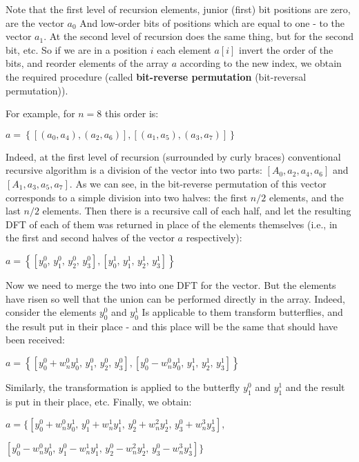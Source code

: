 Note that the first level of recursion elements, junior (first) bit positions are zero, are the vector $a_0$ And low-order bits of positions which are equal to one - to the vector $a_1$. At the second level of recursion does the same thing, but for the second bit, etc. So if we are in a position $i$ each element $a [i]$ invert the order of the bits, and reorder elements of the array $a$ according to the new index, we obtain the required procedure (called \textbf{bit-reverse permutation} (bit-reversal permutation)).

For example, for $n = 8$ this order is:

$a=\left\{ \left[(a_{0},a_{4}),(a_{2},a_{6})\right],\left[(a_{1},a_{5}),(a_{3},a_{7})\right]\right\} $

Indeed, at the first level of recursion (surrounded by curly braces) conventional recursive algorithm is a division of the vector into two parts: $[A_0, a_2, a_4, a_6]$ and $[A_1, a_3, a_5, a_7]$. As we can see, in the bit-reverse permutation of this vector corresponds to a simple division into two halves: the first $n / 2$ elements, and the last $n / 2$ elements. Then there is a recursive call of each half, and let the resulting DFT of each of them was returned in place of the elements themselves (i.e., in the first and second halves of the vector $a$ respectively):

$a=\left\{ \left[y_{0}^{0},\, y_{1}^{0},\, y_{2}^{0},\, y_{3}^{0}\right],\left[y_{0}^{1},\, y_{1}^{1},\, y_{2}^{1},\, y_{3}^{1}\right]\right\} $

Now we need to merge the two into one DFT for the vector. But the elements have risen so well that the union can be performed directly in the array. Indeed, consider the elements $y_0 ^ 0$ and $y_0 ^ 1$ Is applicable to them transform butterflies, and the result put in their place - and this place will be the same that should have been received:

$a=\left\{ \left[y_{0}^{0}+w_{n}^{0}y_{0}^{1},\, y_{1}^{0},\, y_{2}^{0},\, y_{3}^{0}\right],\left[y_{0}^{0}-w_{n}^{0}y_{0}^{1},\, y_{1}^{1},\, y_{2}^{1},\, y_{3}^{1}\right]\right\} $

Similarly, the transformation is applied to the butterfly $y_1 ^ 0$ and $y_1 ^ 1$ and the result is put in their place, etc. Finally, we obtain:

$a=\lbrace\left[y_{0}^{0}+w_{n}^{0}y_{0}^{1},\, y_{1}^{0}+w_{n}^{1}y_{1}^{1},\, y_{2}^{0}+w_{n}^{2}y_{2}^{1},\, y_{3}^{0}+w_{n}^{3}y_{3}^{1}\right],$

$\left[y_{0}^{0}-w_{n}^{0}y_{0}^{1},\, y_{1}^{0}-w_{n}^{1}y_{1}^{1},\, y_{2}^{0}-w_{n}^{2}y_{2}^{1},\, y_{3}^{0}-w_{n}^{3}y_{3}^{1}\right]\rbrace$

